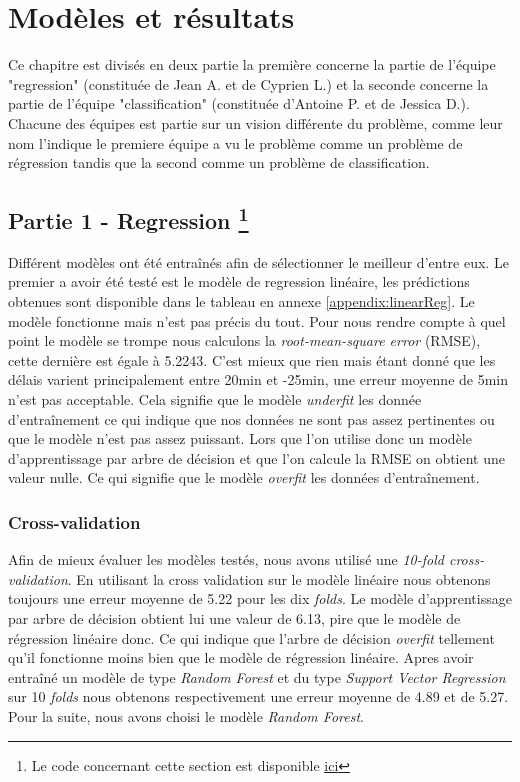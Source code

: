 \chapter{Modèles et résultats}
Ce chapitre est divisés en deux partie la première concerne la partie de l'équipe "regression" (constituée de Jean A. et de Cyprien L.) et la seconde concerne la partie de l'équipe "classification" (constituée d'Antoine P. et de Jessica D.). Chacune des équipes est partie sur un vision différente du problème, comme leur nom l'indique le premiere équipe a vu le problème comme un problème de régression tandis que la second comme un problème de classification.

\section[Partie 1 - Regression]{Partie 1 - Regression \footnote{Le code concernant cette section est disponible \href{https://github.com/jalbrecq/CanYouCatchIt/blob/main/machine_learning/notebook/CanYouCatchIt_3of3.ipynb}{ici}}}

Différent modèles ont été entraînés afin de sélectionner le meilleur d'entre eux. Le premier a avoir été testé est le modèle de regression linéaire, les prédictions obtenues sont disponible dans le tableau en annexe \ref{appendix:linearReg}. Le modèle fonctionne mais n'est pas précis du tout. Pour nous rendre compte à quel point le modèle se trompe nous calculons la  \textit{root-mean-square error} (RMSE), cette dernière est égale à 5.2243. C'est mieux que rien mais étant donné que les délais varient principalement entre 20min et -25min, une erreur moyenne de 5min n'est pas acceptable. Cela signifie que le modèle \textit{underfit} les donnée d'entraînement ce qui indique que nos données ne sont pas assez pertinentes ou que le modèle n'est pas assez puissant. Lors que l'on utilise donc un modèle d'apprentissage par arbre de décision et que l'on calcule la RMSE on obtient une valeur nulle. Ce qui signifie que le modèle \textit{overfit} les données d'entraînement.

\subsection{Cross-validation}
Afin de mieux évaluer les modèles testés, nous avons utilisé une \textit{10-fold cross-validation}. En utilisant la cross validation sur le modèle linéaire nous obtenons toujours une erreur moyenne de 5.22 pour les dix \textit{folds}. Le modèle d'apprentissage par arbre de décision obtient lui une valeur de 6.13, pire que le modèle de régression linéaire donc. Ce qui indique que l'arbre de décision \textit{overfit} tellement qu'il fonctionne moins bien que le modèle de régression linéaire. Apres avoir entraîné un modèle de type \textit{Random Forest} et du type \textit{Support Vector Regression} sur 10 \textit{folds} nous obtenons respectivement une erreur moyenne de 4.89 et de 5.27. Pour la suite, nous avons choisi le modèle \textit{Random Forest}.

